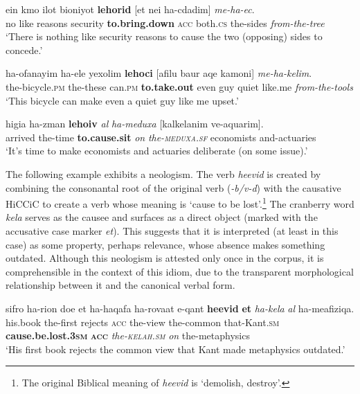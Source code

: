 \documentclass[output=paper]{langsci/langscibook}
\begin{document}
    \ea\label{she:ec-cause}
        \gll {\alef}ein kmo {\ayin}ilot bi{\tet}{\het}oniyot \textbf{lehorid} \textnormal{[}{\alef}et {\shin}nei ha-cdadim\textnormal{]} \textit{me-ha-{\ayin}ec}.\\
            no like reasons security \textbf{to.bring.down} \spacebr{}\textsc{acc} both.\textsc{cs} the-sides \textit{from-the-tree}\\
        \glt `There is nothing like security reasons to cause the two (opposing) sides to concede.'\\
    \z

	\ea\label{she:yaca-cause}
    	\gll ha-{\alef}ofanayim ha-{\alef}ele yexolim \textbf{lehoci} \textnormal{[}{\alef}afilu ba{\het}ur {\shin}aqe{\tet} kamoni\textnormal{]} \textit{me-ha-kelim}.\\
    	   the-bicycle.\textsc{pm} the-these can.\textsc{pm} \textbf{to.take.out} \spacebr{}even guy quiet like.me \textit{from-the-tools}\\
    	\glt `This bicycle can make even a quiet guy like me upset.'
	\z

    \ea\label{she:meduxa-cause}
        \gll higi{\ayin}a ha-zman \textbf{leho{\shinB}iv} \textit{{\ayin}al} \textit{ha-meduxa} \textnormal{[}kalkelanim ve-aq{\tet}u{\alef}arim\textnormal{]}.\\
            arrived the-time \textbf{to.cause.sit} \textit{on} \textit{the-\textsc{meduxa}.\textsc{sf}} \spacebr{}economists and-actuaries\\
        \glt `It's time to make economists and actuaries deliberate (on some issue).'
    \z

The following example exhibits a neologism. The verb \textit{he{\alef}evid} is created by combining the consonantal root of the original verb  (\textit{{\alef}-b/v-d}) with the causative  HiCCiC to create a verb whose meaning is `cause to be lost'.\footnote{The original Biblical meaning of \textit{he{\alef}evid} is `demolish, destroy'.} The cranberry word \textit{kela{\het}} serves as the causee and surfaces as a direct object (marked with the accusative case marker \textit{{\alef}et}). This suggests that it is interpreted (at least in this case) as some property, perhaps relevance, whose absence makes something outdated. Although this neologism is attested only once in the corpus, it is comprehensible in the context of this idiom, due to the transparent morphological relationship between it and the canonical verbal form.

    \ea\label{she:kelax-cause}
        \gll sifro ha-ri{\shin}on do{\het}e {\alef}et ha-ha{\shin}qafa ha-rova{\het}at {\shin}e-qant \textbf{he{\alefB}evid} \textbf{{\alefB}et} \textit{ha-kela{\het}} \textit{{\ayin}al} ha-me{\tet}afiziqa.\\
            his.book the-first rejects \textsc{acc} the-view the-common that-Kant.\textsc{sm} \textbf{cause.be.lost.\textsc{3sm}} \textbf{\textsc{acc}} \textit{the-\textsc{kelah}.\textsc{sm}} \textit{on} the-metaphysics\\
        \glt `His first book rejects the common view that Kant made metaphysics outdated.'
    \z
\end{document}
